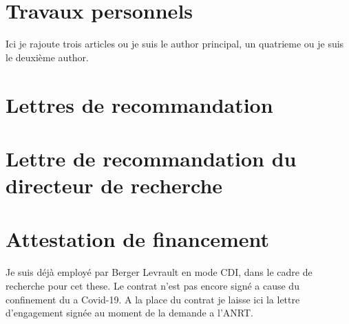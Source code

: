 \documentclass[11pt]{article} %
\begin{document}
\section{Travaux personnels}
   Ici je rajoute trois articles ou je suis le author principal, un quatrieme ou je suis le deuxième author.
 
 
 
 
 

\section{Lettres de recommandation}

 
 


\section{Lettre de recommandation du directeur de recherche}
 
 
 
 
\section{Attestation de financement}
  Je suis déjà employé par Berger Levrault en mode CDI, dans le cadre de recherche pour cet these. Le contrat n'est pas encore signé a cause du confinement du a Covid-19. 
  A la place du contrat je laisse ici la lettre d'engagement signée au moment de la demande a l'ANRT. 
  
  

 


\end{document}
